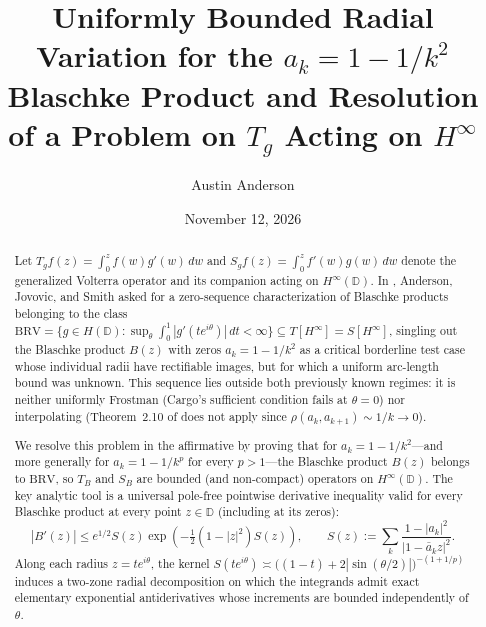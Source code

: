 \documentclass[11pt,reqno]{amsart}
\numberwithin{equation}{section}
\newcommand{\D}{\mathbb{D}}
\newcommand{\BRV}{\mathrm{BRV}}
\begin{document}
\title[Bounded Radial Variation for the $1 - 1/k^2$ Blaschke Product]
{Uniformly Bounded Radial Variation for the $a_k = 1 - 1/k^2$ Blaschke Product and Resolution of a Problem on $T_g$ Acting on $H^\infty$}
\date{November 12, 2026}

\author[A. Anderson]{Austin Anderson}


\begin{abstract}
Let $T_g f(z) = \int_0^z f(w) g'(w)\,dw$ and $S_g f(z) = \int_0^z f'(w) g(w)\,dw$ denote the generalized Volterra operator and its companion acting on $H^\infty(\D)$. In \cite[Problem~4.3]{AJS14}, Anderson, Jovovic, and Smith asked for a zero-sequence characterization of Blaschke products belonging to the class $\BRV = \{g \in H(\D) : \sup_{\theta} \int_0^1 |g'(te^{i\theta})|\,dt < \infty\} \subseteq T[H^\infty] = S[H^\infty]$, singling out the Blaschke product $B(z)$ with zeros $a_k = 1 - 1/k^2$ as a critical borderline test case whose individual radii have rectifiable images, but for which a uniform arc-length bound was unknown. This sequence lies outside both previously known regimes: it is neither uniformly Frostman (Cargo's sufficient condition fails at $\theta = 0$) nor interpolating (Theorem~2.10 of \cite{AJS14} does not apply since $\rho(a_k, a_{k+1}) \sim 1/k \to 0$).

We resolve this problem in the affirmative by proving that for $a_k = 1 - 1/k^2$---and more generally for $a_k = 1 - 1/k^p$ for every $p > 1$---the Blaschke product $B(z)$ belongs to $\BRV$, so $T_B$ and $S_B$ are bounded (and non-compact) operators on $H^\infty(\D)$. The key analytic tool is a universal pole-free pointwise derivative inequality valid for every Blaschke product at every point $z \in \D$ (including at its zeros):
\[
  |B'(z)| \le e^{1/2} S(z) \exp\!\left(-\tfrac{1}{2}(1 - |z|^2) S(z)\right), \qquad S(z) := \sum_{k} \frac{1 - |a_k|^2}{|1 - \bar{a}_k z|^2}.
\]
Along each radius $z = t e^{i\theta}$, the kernel $S(t e^{i\theta}) \asymp \bigl((1 - t) + 2|\sin(\theta/2)|\bigr)^{-(1 + 1/p)}$ induces a two-zone radial decomposition on which the integrands admit exact elementary exponential antiderivatives whose increments are bounded independently of $\theta$.
\end{abstract}

\maketitle
\end{document}
